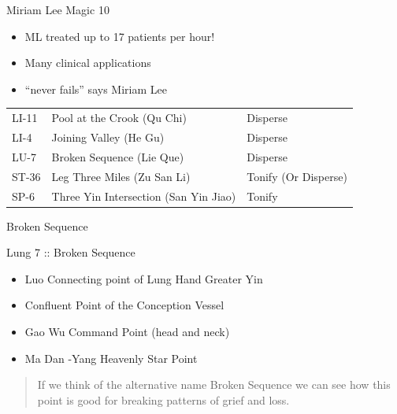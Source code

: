 \begin{frame}{Miriam Lee Magic 10}
\begin{itemize}
\item ML treated up to 17 patients per hour!
\item Many clinical applications
\item ``never fails'' says Miriam Lee
\end{itemize}

\begin{table}[]
\begin{tabular}{@{}lll@{}}
\toprule
LI-11 & Pool at the Crook (Qu Chi)            & Disperse             \\
LI-4  & Joining Valley (He Gu)                & Disperse             \\
LU-7  & Broken Sequence (Lie Que)             & Disperse             \\
ST-36 & Leg Three Miles (Zu San Li)           & Tonify (Or Disperse) \\
SP-6  & Three Yin Intersection (San Yin Jiao) & Tonify               \\ \bottomrule
\end{tabular}
\end{table}

\end{frame}

\begin{frame}{Broken Sequence}

\large{Lung 7 :: Broken Sequence}

\begin{itemize}
\item Luo Connecting point of Lung Hand Greater Yin
\item Confluent Point of the Conception Vessel
\item Gao Wu Command Point (head and neck)
\item Ma Dan -Yang Heavenly Star Point
\end{itemize}

\vspace{1em}

\begin{quote}
If we think of the alternative name Broken Sequence we can see how this point is good for breaking patterns of grief and loss.
\end{quote}

\end{frame}


